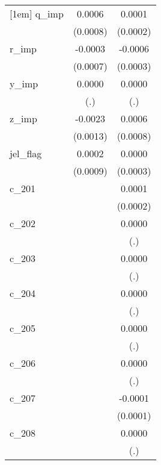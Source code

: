 {\begin{tabular}{l*{2}{c}}
[1em]
q\_imp       &      0.0006        &      0.0001        \\
            &    (0.0008)        &    (0.0002)        \\
[1em]
r\_imp       &     -0.0003        &     -0.0006\sym{**}\\
            &    (0.0007)        &    (0.0003)        \\
[1em]
y\_imp       &      0.0000        &      0.0000        \\
            &         (.)        &         (.)        \\
[1em]
z\_imp       &     -0.0023\sym{*} &      0.0006        \\
            &    (0.0013)        &    (0.0008)        \\
[1em]
jel\_flag    &      0.0002        &      0.0000        \\
            &    (0.0009)        &    (0.0003)        \\
[1em]
c\_201       &                    &      0.0001        \\
            &                    &    (0.0002)        \\
[1em]
c\_202       &                    &      0.0000        \\
            &                    &         (.)        \\
[1em]
c\_203       &                    &      0.0000        \\
            &                    &         (.)        \\
[1em]
c\_204       &                    &      0.0000        \\
            &                    &         (.)        \\
[1em]
c\_205       &                    &      0.0000        \\
            &                    &         (.)        \\
[1em]
c\_206       &                    &      0.0000        \\
            &                    &         (.)        \\
[1em]
c\_207       &                    &     -0.0001        \\
            &                    &    (0.0001)        \\
[1em]
c\_208       &                    &      0.0000        \\
            &                    &         (.)        \\

\end{tabular}}
